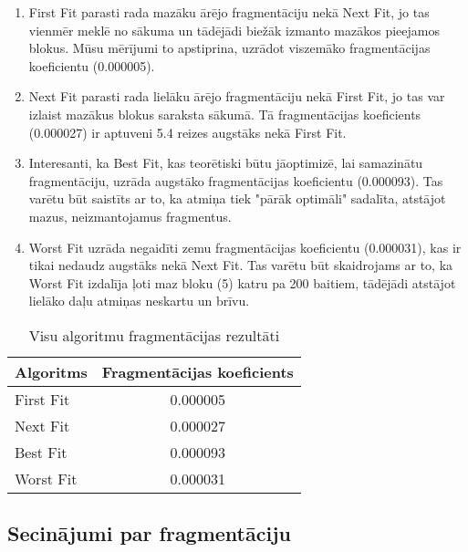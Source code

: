 \documentclass{report}
\begin{document}
	\begin{enumerate}
		\item First Fit parasti rada mazāku ārējo fragmentāciju nekā Next Fit, jo tas vienmēr meklē no sākuma un tādējādi biežāk izmanto mazākos pieejamos blokus. Mūsu mērījumi to apstiprina, uzrādot viszemāko fragmentācijas koeficientu (0.000005).
		
		\item Next Fit parasti rada lielāku ārējo fragmentāciju nekā First Fit, jo tas var izlaist mazākus blokus saraksta sākumā. Tā fragmentācijas koeficients (0.000027) ir aptuveni 5.4 reizes augstāks nekā First Fit.
		
		\item Interesanti, ka Best Fit, kas teorētiski būtu jāoptimizē, lai samazinātu fragmentāciju, uzrāda augstāko fragmentācijas koeficientu (0.000093). Tas varētu būt saistīts ar to, ka atmiņa tiek "pārāk optimāli" sadalīta, atstājot mazus, neizmantojamus fragmentus.
		
		\item Worst Fit uzrāda negaidīti zemu fragmentācijas koeficientu (0.000031), kas ir tikai nedaudz augstāks nekā Next Fit. Tas varētu būt skaidrojams ar to, ka Worst Fit izdalīja ļoti maz bloku (5) katru pa 200 baitiem, tādējādi atstājot lielāko daļu atmiņas neskartu un brīvu.
	\end{enumerate}

	\begin{table}[h]
		\centering
		\begin{tabular}{lc}
			\toprule
			\textbf{Algoritms} & \textbf{Fragmentācijas koeficients} \\
			\midrule
			First Fit & 0.000005 \\
			Next Fit & 0.000027 \\
			Best Fit & 0.000093 \\
			Worst Fit & 0.000031 \\
			\bottomrule
		\end{tabular}
		\caption{Visu algoritmu fragmentācijas rezultāti}
		\label{tab:fragmentation}
	\end{table}	

	
	\subsection{Secinājumi par fragmentāciju}
	
\end{document}
